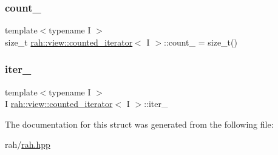\subsubsection{\texorpdfstring{count\_}{count\_}}
{\footnotesize\ttfamily template$<$typename I $>$ \\
size\+\_\+t \mbox{\hyperlink{structrah_1_1view_1_1counted__iterator}{rah\+::view\+::counted\+\_\+iterator}}$<$ I $>$\+::count\+\_\+ = size\+\_\+t()}

\mbox{\label{structrah_1_1view_1_1counted__iterator_a907dba6ac64293e4c5718e522da4972e}} 
\subsubsection{\texorpdfstring{iter\_}{iter\_}}
{\footnotesize\ttfamily template$<$typename I $>$ \\
I \mbox{\hyperlink{structrah_1_1view_1_1counted__iterator}{rah\+::view\+::counted\+\_\+iterator}}$<$ I $>$\+::iter\+\_\+}



The documentation for this struct was generated from the following file\+:\begin{DoxyCompactItemize}
\item 
rah/\mbox{\hyperlink{rah_8hpp}{rah.\+hpp}}\end{DoxyCompactItemize}
